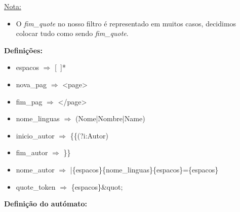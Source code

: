 \documentclass[11pt,a4paper]{report}
\begin{document}
\underline{Nota:}
\begin{itemize}
	\item O \emph{fim\_quote} no nosso filtro é representado em muitos casos, decidimos colocar tudo como sendo \emph{fim\_quote}.
\end{itemize}

	\vspace{1.5cm}

\textbf{Definições:}
\begin{itemize}
	\item espacos $\Rightarrow$ [\ ]*
	\item nova\_pag $\Rightarrow$ <page>
	\item fim\_pag $\Rightarrow$ </page>
	\item nome\_linguas $\Rightarrow$ (Nome|Nombre|Name)
	\item inicio\_autor $\Rightarrow$ \{\{(?i:Autor)
	\item fim\_autor $\Rightarrow$ \}\}
	\item nome\_autor $\Rightarrow$ |\{espacos\}\{nome\_linguas\}\{espacos\}=\{espacos\}
	\item quote\_token $\Rightarrow$ \{espacos\}\&quot;
\end{itemize}

\vspace{0.5cm}

\textbf{Definição do autómato:}
\end{document}
